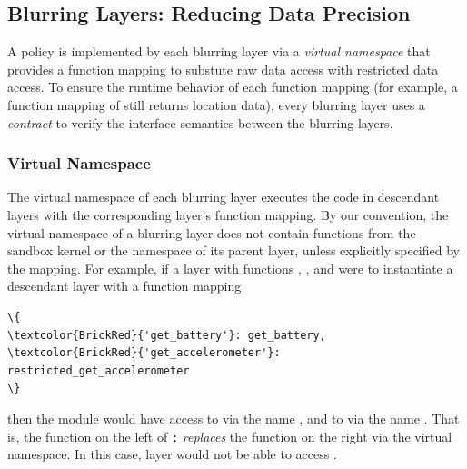 \subsection{Blurring Layers: Reducing Data Precision}\label{sec-layer}



A policy is implemented by each blurring layer via a \textit{virtual 
namespace} that provides a function mapping to substute raw 
data access with restricted data access. 
To ensure the runtime behavior of each function mapping (for example, 
a function mapping of  still returns location data), 
every blurring layer uses a \textit{contract} to verify the interface 
semantics between the blurring layers.

\subsubsection{Virtual Namespace}

The virtual namespace of each blurring layer executes the code in descendant 
layers with the corresponding layer's function mapping. By our convention, 
the virtual namespace of a blurring layer does not contain functions from the 
sandbox kernel or the namespace of its parent layer, unless explicitly 
specified by the mapping. 
For example, if a layer  with 
functions , , and 
 were to instantiate a descendant 
layer  with a function mapping 

\begin{Verbatim}
\{
\textcolor{BrickRed}{'get_battery'}: get_battery, 
\textcolor{BrickRed}{'get_accelerometer'}: restricted_get_accelerometer
\}
\end{Verbatim}
then the module  would have access
to  via the name , and to
 via the name 
. That is, the function on the left of \texttt{:}
\textit{replaces} the function on the right via the virtual namespace. 
In this case, layer  would not be able to access 
.

